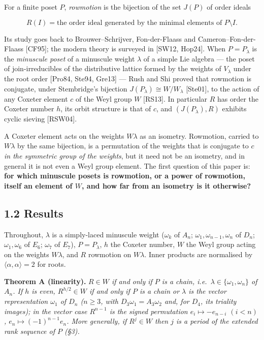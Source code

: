 \documentclass[
]{article}
\begin{document}
For a finite poset \(P\), \emph{rowmotion} is the bijection of the set
\(J(P)\) of order ideals

\[R(I) = \text{the order ideal generated by the minimal elements of } P \setminus I .\]

Its study goes back to Brouwer--Schrijver, Fon-der-Flaass and
Cameron--Fon-der-Flaass {[}CF95{]}; the modern theory is surveyed in
{[}SW12, Hop24{]}. When \(P = P_\lambda\) is the \emph{minuscule poset}
of a minuscule weight \(\lambda\) of a simple Lie algebra --- the poset
of join-irreducibles of the distributive lattice formed by the weights
of \(V_\lambda\) under the root order {[}Pro84, Ste94, Gre13{]} --- Rush
and Shi proved that rowmotion is conjugate, under Stembridge's bijection
\(J(P_\lambda) \cong W/W_\lambda\) {[}Ste01{]}, to the action of any
Coxeter element \(c\) of the Weyl group \(W\) {[}RS13{]}. In particular
\(R\) has order the Coxeter number \(h\), its orbit structure is that of
\(c\), and \((J(P_\lambda), R)\) exhibits cyclic sieving {[}RSW04{]}.

A Coxeter element acts on the weights \(W\lambda\) as an isometry.
Rowmotion, carried to \(W\lambda\) by the same bijection, is a
permutation of the weights that is conjugate to \(c\) \emph{in the
symmetric group of the weights}, but it need not be an isometry, and in
general it is not even a Weyl group element. The first question of this
paper is: \textbf{for which minuscule posets is rowmotion, or a power of
rowmotion, itself an element of \(W\), and how far from an isometry is
it otherwise?}

\subsection{1.2 Results}\label{results}

Throughout, \(\lambda\) is a simply-laced minuscule weight (\(\omega_k\)
of \(A_n\); \(\omega_1, \omega_{n-1}, \omega_n\) of \(D_n\);
\(\omega_1, \omega_6\) of \(E_6\); \(\omega_7\) of \(E_7\)),
\(P = P_\lambda\), \(h\) the Coxeter number, \(W\) the Weyl group acting
on the weights \(W\lambda\), and \(R\) rowmotion on \(W\lambda\). Inner
products are normalised by \(\langle \alpha, \alpha \rangle = 2\) for
roots.

\textbf{Theorem A (linearity).} \emph{\(R \in W\) if and only if \(P\)
is a chain, i.e.~\(\lambda \in \{\omega_1, \omega_n\}\) of \(A_n\). If
\(h\) is even, \(R^{h/2} \in W\) if and only if \(P\) is a chain or
\(\lambda\) is the vector representation \(\omega_1\) of \(D_n\)
(\(n \ge 3\), with \(D_3\omega_1 = A_3\omega_2\) and, for \(D_4\), its
triality images); in the vector case \(R^{n-1}\) is the signed
permutation \(e_i \mapsto -e_{n-i}\) \((i<n)\),
\(e_n \mapsto (-1)^{n-1}e_n\). More generally, if \(R^j \in W\) then
\(j\) is a period of the extended rank sequence of \(P\) (§3).}
\end{document}
